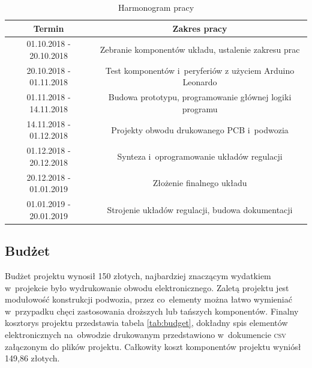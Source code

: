 \documentclass[11pt]{article}
\begin{document}
\begin{table}[hbt]
	\centering
	\begin{tabular}{|c|c|}
	\hline
Termin                  & Zakres pracy                                                                         \\ \hline
01.10.2018 - 20.10.2018 & Zebranie komponentów układu, ustalenie zakresu prac                                  \\ \hline
20.10.2018 - 01.11.2018 & Test komponentów i~peryferiów z użyciem Arduino Leonardo                             \\ \hline
01.11.2018 - 14.11.2018 & Budowa prototypu, programowanie głównej logiki programu \\ \hline
14.11.2018 - 01.12.2018 & Projekty obwodu drukowanego PCB i~podwozia                                           \\ \hline
01.12.2018 - 20.12.2018 & Synteza i~oprogramowanie układów regulacji                                           \\ \hline
20.12.2018 - 01.01.2019 & Złożenie finalnego układu                                                            \\ \hline
01.01.2019 - 20.01.2019 & Strojenie układów regulacji, budowa dokumentacji                                      \\ \hline
	\end{tabular}
	\caption{Harmonogram pracy}
	\label{tab:sched}
\end{table}

\subsection{Budżet}
Budżet projektu wynosił 150 złotych, najbardziej znaczącym wydatkiem w~projekcie było wydrukowanie obwodu elektronicznego.
Zaletą projektu jest modułowość konstrukcji podwozia, przez co~elementy można łatwo wymieniać w~przypadku chęci zastosowania droższych lub tańszych komponentów.
Finalny kosztorys projektu przedstawia tabela \ref{tab:budget}, dokładny spis elementów elektronicznych na~obwodzie drukowanym przedstawiono w~dokumencie \textsc{csv} załączonym do plików projektu.
Całkowity koszt komponentów projektu wyniósł 149,86 złotych.
\end{document}

